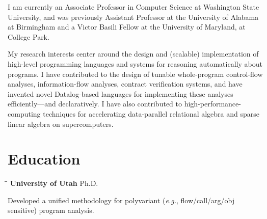 \documentclass[line]{res}
\begin{document}

\address{\bf gilray.org
\ \ \ \ \ \ \ \ }
                                  
\begin{resume}        

\vspace{-0.1in}  
I am currently an Associate Professor in Computer Science at Washington State University, and was previously Assistant Professor at the University of Alabama at Birmingham and a Victor Basili Fellow at the University of Maryland, at College Park.

My research interests center around the design and (scalable) implementation of high-level programming languages and systems for reasoning automatically about programs. I have contributed to the design of tunable whole-program control-flow analyses, information-flow analyses, contract verification systems, and have invented novel Datalog-based languages for implementing these analyses efficiently---and declaratively. I have also contributed to high-performance-computing techniques for accelerating data-parallel relational algebra and sparse linear algebra on supercomputers.

\section{\large Education}          
    \vspace{-0.1cm}	
    \begin{tabbing}
    \hspace{2.25in}\= \hspace{2.25in}\= \kill %
    {\bf University of Utah} \>Ph.D.     
    \end{tabbing}\vspace{-0.5cm}
    Developed a unified methodology for polyvariant (\textit{e.g.}, flow/call/arg/obj sensitive) program analysis.%
    

\end{resume}
\end{document}
